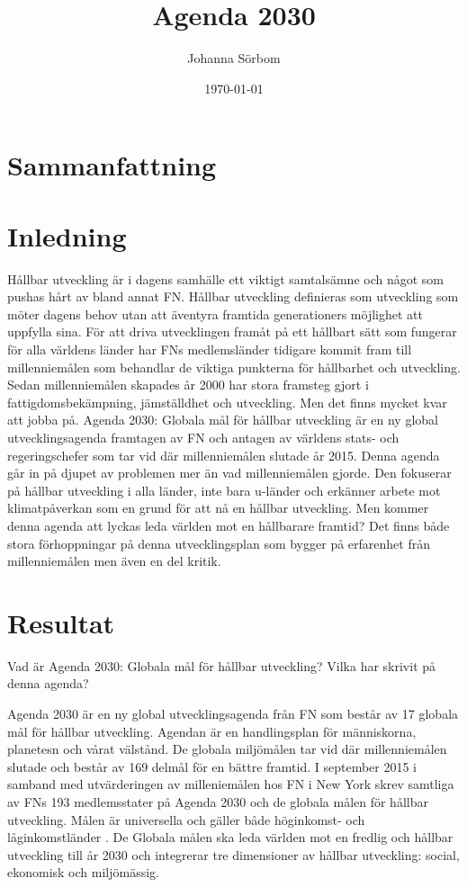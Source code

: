 \documentclass{report}
\title{Agenda 2030}
\date{\today}
\author{Johanna Sörbom}
\begin{document}
\maketitle
\newpage
\tableofcontents
\newpage
\section*{Sammanfattning}
\newpage
\section{Inledning}
Hållbar utveckling är i dagens samhälle ett viktigt samtalsämne och något som pushas hårt av bland annat FN. Hållbar utveckling definieras som utveckling som möter dagens behov utan att äventyra framtida generationers möjlighet att uppfylla sina.\cite{web2030agenda}
För att driva utvecklingen framåt på ett hållbart sätt som fungerar för alla världens länder har FNs medlemsländer tidigare kommit fram till millenniemålen som behandlar de viktiga punkterna för hållbarhet och utveckling.  Sedan millenniemålen skapades år 2000 har stora framsteg gjort i fattigdomsbekämpning, jämställdhet och utveckling. Men det finns mycket kvar att jobba på. \cite{webEuropeanComission}
Agenda 2030: Globala mål för hållbar utveckling är en ny global utvecklingsagenda framtagen av FN och antagen av världens stats- och regeringschefer som tar vid där millenniemålen slutade år 2015. Denna agenda går in på djupet av problemen mer än vad millenniemålen gjorde. Den fokuserar på hållbar utveckling i alla länder, inte bara u-länder och erkänner arbete mot klimatpåverkan som en grund för att nå en hållbar utveckling. Men kommer denna agenda att lyckas leda världen mot en hållbarare framtid? Det finns både stora förhoppningar på denna utvecklingsplan som bygger på erfarenhet från millenniemålen men även en del kritik. 

\section{Resultat}
Vad är Agenda 2030: Globala mål för hållbar utveckling? 
Vilka har skrivit på denna agenda?


Agenda 2030 är en ny global utvecklingsagenda från FN som består av 17 globala mål för hållbar utveckling. \cite{webUNASweden} Agendan\cite{nam2015transforming} är en handlingsplan för människorna, planetesn och vårat välstånd. De globala miljömålen tar vid där millenniemålen slutade och består av 169 delmål för en bättre framtid. I september 2015 i samband med utvärderingen av milleniemålen hos FN i New York skrev samtliga av FNs 193 medlemsstater på Agenda 2030 och de globala målen för hållbar utveckling. \cite{webUNASweden} Målen är universella och gäller både höginkomst- och låginkomstländer \cite{webUNDP}. De Globala målen ska leda världen mot en fredlig och hållbar utveckling till år 2030 och integrerar tre dimensioner av hållbar utveckling: social, ekonomisk och miljömässig.  \cite{UNA Sweden}
\end{document}
